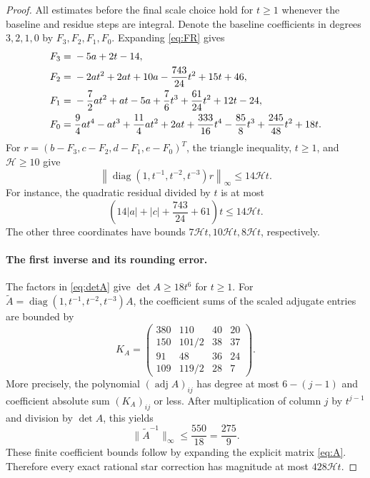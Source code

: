\documentclass[11pt,a4paper]{article}
\theoremstyle{definition}
\newcommand{\htf}{\mathcal H}
\DeclareMathOperator{\diag}{diag}
\begin{document}
\begin{proof}
All estimates before the final scale choice hold for $t\ge1$ whenever
the baseline and residue steps are integral. Denote the baseline
coefficients in degrees $3,2,1,0$ by $F_3,F_2,F_1,F_0$.
Expanding \eqref{eq:FR} gives
\begin{align}
 F_3={}&-5a+2t-14,\notag\\
 F_2={}&-2at^2+2at+10a-\frac{743}{24}t^2+15t+46,\notag\\
 F_1={}&-\frac72at^2+at-5a+\frac76t^3+\frac{61}{24}t^2+12t-24,\label{eq:Fbaseline}\\
 F_0={}&\frac94at^4-at^3+\frac{11}{4}at^2+2at
        +\frac{333}{16}t^4-\frac{85}{8}t^3
        +\frac{245}{48}t^2+18t.\notag
\end{align}
For $r=(b-F_3,c-F_2,d-F_1,e-F_0)^T$, the triangle inequality,
$t\ge1$, and $\htf\ge10$ give
\begin{equation}\label{eq:rbound}
 \left\|\diag(1,t^{-1},t^{-2},t^{-3})r\right\|_\infty
 \le14\htf t.
\end{equation}
For instance, the quadratic residual divided by $t$ is at most
\[
 \left(14|a|+|c|+\frac{743}{24}+61\right)t
 \le14\htf t.
\]
The other three coordinates have bounds $7\htf t,10\htf t,8\htf t$,
respectively.

\paragraph{The first inverse and its rounding error.}
The factors in \eqref{eq:detA} give $\det A\ge18t^6$ for $t\ge1$.
For $\widetilde A=\diag(1,t^{-1},t^{-2},t^{-3})A$,
the coefficient sums of the scaled adjugate entries are bounded by
\[
 K_A=\begin{pmatrix}
 380&110&40&20\\
 150&101/2&38&37\\
 91&48&36&24\\
 109&119/2&28&7
 \end{pmatrix}.
\]
More precisely, the polynomial $(\operatorname{adj}A)_{ij}$ has degree
at most $6-(j-1)$ and coefficient absolute sum $(K_A)_{ij}$ or less.
After multiplication of column $j$ by $t^{j-1}$ and division by
$\det A$, this yields
\begin{equation}\label{eq:Ainversebound}
 \|\widetilde A^{-1}\|_\infty\le\frac{550}{18}=\frac{275}{9}.
\end{equation}
These finite coefficient bounds follow by expanding the explicit matrix
\eqref{eq:A}. Therefore every exact rational star correction has magnitude
at most $428\htf t$.


\end{proof}
\end{document}
